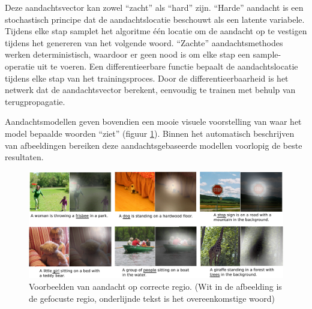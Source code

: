 Deze aandachtsvector kan zowel ``zacht'' als ``hard'' zijn. ``Harde'' aandacht is een stochastisch principe dat de aandachtslocatie beschouwt als een latente variabele. Tijdens elke stap samplet het algoritme \'e\'en locatie om de aandacht op te vestigen tijdens het genereren van het volgende woord. ``Zachte'' aandachtsmethodes werken deterministisch, waardoor er geen nood is om elke stap een sample-operatie uit te voeren. Een differentieerbare functie bepaalt de aandachtslocatie tijdens elke stap van het trainingsproces. Door de differentieerbaarheid is het netwerk dat de aandachtsvector berekent, eenvoudig te trainen met behulp van terugpropagatie.

Aandachtsmodellen geven bovendien een mooie visuele voorstelling van waar het model bepaalde woorden ``ziet'' (figuur \ref{fig:attention-example}). Binnen het automatisch beschrijven van afbeeldingen bereiken deze aandachtsgebaseerde modellen voorlopig de beste resultaten\cite{Jin2015,Xu2015}.

\begin{figure}[tb]
	\centering
	\includegraphics[width=\linewidth]{Images/good_Xu.pdf}
	\caption[Voorbeelden van aandacht op correcte regio.]{Voorbeelden van aandacht op correcte regio. (Wit in de afbeelding is de gefocuste regio, onderlijnde tekst is het overeenkomstige woord)\cite{Xu2015}}
	\label{fig:attention-example}
\end{figure}

